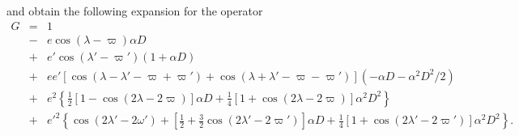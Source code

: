 \documentclass [12pt, a4paper] {article}
\begin{document}
and obtain the following expansion for the operator
\begin {eqnarray}
    \label{eq:G}
    G 
    &=& 
    1
    \\\nonumber
    &-& 
    e\cos(\lambda - \varpi)\alpha D
    \\\nonumber
    &+& 
    e'\cos(\lambda' - \varpi')(1 + \alpha D)
    \\\nonumber
    &+& 
    ee'\left[
        \cos(\lambda - \lambda' - \varpi + \varpi')
        +
        \cos(\lambda + \lambda' - \varpi - \varpi')    
    \right](-\alpha D - \alpha^2D^2/2)
    \\\nonumber
    &+& 
    e^2
    \left\{
        \frac{1}{2}
        \left[
            1 - \cos(2\lambda - 2\varpi)
        \right]\alpha D
        +
        \frac{1}{4}
        \left[
            1 + \cos(2\lambda - 2\varpi)
        \right]
        \alpha^2D^2
    \right\}
    \\\nonumber
    &+& 
    e'^2
    \left\{
    \cos(2\lambda' - 2\omega')
    + 
    \left[
            \frac{1}{2} 
            + 
            \frac{3}{2}\cos(2\lambda' - 2\varpi')
    \right]
    \alpha D 
    +
    \frac{1}{4}[1 + \cos(2\lambda' - 2\varpi')]
    \alpha^2 D^2
    \right\}.
\end {eqnarray} 
\end{document}
